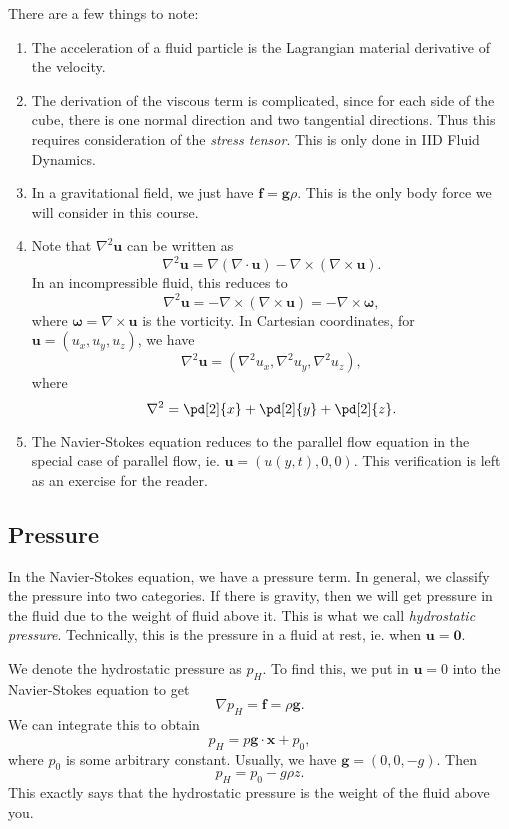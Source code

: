 \documentclass[a4paper]{article}
\begin{document}
There are a few things to note:
\begin{enumerate}
  \item The acceleration of a fluid particle is the Lagrangian material derivative of the velocity.
  \item The derivation of the viscous term is complicated, since for each side of the cube, there is one normal direction and two tangential directions. Thus this requires consideration of the \emph{stress tensor}. This is only done in IID Fluid Dynamics.
  \item In a gravitational field, we just have $\mathbf{f} = \mathbf{g}\rho$. This is the only body force we will consider in this course.
  \item Note that $\nabla^2 \mathbf{u}$ can be written as
    \[
      \nabla^2 \mathbf{u} = \nabla (\nabla \cdot \mathbf{u}) - \nabla \times (\nabla \times \mathbf{u}).
    \]
    In an incompressible fluid, this reduces to
    \[
      \nabla^2 \mathbf{u} = -\nabla \times (\nabla \times \mathbf{u}) = -\nabla \times \boldsymbol\omega,
    \]
    where $\boldsymbol\omega = \nabla \times \mathbf{u}$ is the vorticity. In Cartesian coordinates, for $\mathbf{u} = (u_x, u_y, u_z)$, we have
    \[
      \nabla^2 \mathbf{u} = (\nabla^2 u_x, \nabla^2 u_y, \nabla^2 u_z),
    \]
    where
    \[
      \nabla^2 = \pd[2]{x} + \pd[2]{y} + \pd[2]{z}.
    \]
  \item The Navier-Stokes equation reduces to the parallel flow equation in the special case of parallel flow, ie. $\mathbf{u} = (u(y, t), 0, 0)$. This verification is left as an exercise for the reader.
\end{enumerate}

\subsection{Pressure}
In the Navier-Stokes equation, we have a pressure term. In general, we classify the pressure into two categories. If there is gravity, then we will get pressure in the fluid due to the weight of fluid above it. This is what we call \emph{hydrostatic pressure}. Technically, this is the pressure in a fluid at rest, ie. when $\mathbf{u} = \mathbf{0}$.

We denote the hydrostatic pressure as $p_H$. To find this, we put in $\mathbf{u} = 0$ into the Navier-Stokes equation to get
\[
  \nabla p_H = \mathbf{f} = \rho \mathbf{g}.
\]
We can integrate this to obtain
\[
  p_H = p \mathbf{g}\cdot \mathbf{x} + p_0,
\]
where $p_0$ is some arbitrary constant. Usually, we have $\mathbf{g} = (0, 0, -g)$. Then
\[
  p_H = p_0 - g \rho z.
\]
This exactly says that the hydrostatic pressure is the weight of the fluid above you.
\end{document}
